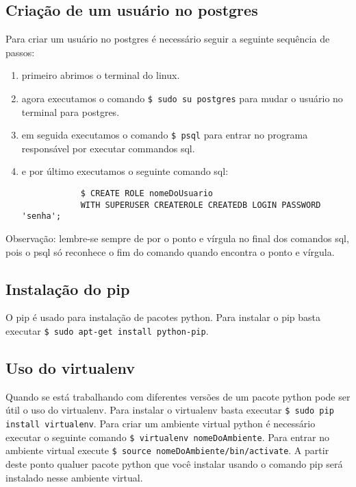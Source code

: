 \documentclass[12pt,a4paper]{article}
\begin{document}
\subsection{Criação de um usuário no postgres}
Para criar um usuário no postgres é necessário seguir a seguinte sequência de passos:

\begin{enumerate}
	\item primeiro abrimos o terminal do linux.
	\item agora executamos o comando \verb|$ sudo su postgres| para mudar o usuário no terminal para postgres.
	\item em seguida executamos o comando \verb|$ psql| para entrar no programa responsável por executar commandos sql.
	\item e por último executamos o seguinte comando sql:
		\begin{verbatim}
			$ CREATE ROLE nomeDoUsuario 
			WITH SUPERUSER CREATEROLE CREATEDB LOGIN PASSWORD 'senha';
		\end{verbatim}
\end{enumerate}

Observação: lembre-se sempre de por o ponto e vírgula no final dos comandos sql, pois o psql só reconhece o fim do comando quando encontra o ponto e vírgula.

\subsection{Instalação do pip}
O pip é usado para instalação de pacotes python.
Para instalar o pip basta executar \verb|$ sudo apt-get install python-pip|.

\subsection{Uso do virtualenv}
Quando se está trabalhando com diferentes versões de um pacote python pode ser útil o uso do virtualenv.
Para instalar o virtualenv basta executar \verb|$ sudo pip install virtualenv|.
Para criar um ambiente virtual python é necessário executar o seguinte comando \verb|$ virtualenv nomeDoAmbiente|. Para entrar no ambiente virtual execute \verb|$ source nomeDoAmbiente/bin/activate|. A partir deste ponto qualuer pacote python que você instalar usando o comando pip será instalado nesse ambiente virtual.
\end{document}
